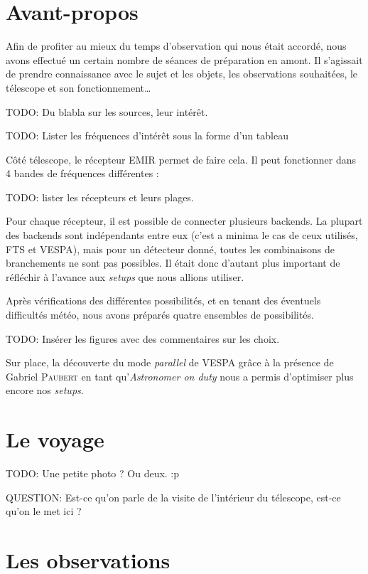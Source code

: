 \documentclass[a4paper,10pt,french]{article}
\begin{document}
\newpage


\setlength{\parindent}{16pt}
\setlength{\parskip}{1ex}


\section{Avant-propos}

Afin de profiter au mieux du temps d’observation qui nous était accordé, nous
avons effectué un certain nombre de séances de préparation en amont. Il
s’agissait de prendre connaissance avec le sujet et les objets, les
observations souhaitées, le télescope et son fonctionnement…

TODO: Du blabla sur les sources, leur intérêt.

TODO: Lister les fréquences d’intérêt sous la forme d’un tableau

Côté télescope, le récepteur EMIR permet de faire cela. Il peut fonctionner
dans 4 bandes de fréquences différentes :

TODO: lister les récepteurs et leurs plages.

Pour chaque récepteur, il est possible de connecter plusieurs backends. La
plupart des backends sont indépendants entre eux (c’est a minima le cas de ceux
utilisés, FTS et VESPA), mais pour un détecteur donné, toutes les combinaisons
de branchements ne sont pas possibles. Il était donc d’autant plus important de
réfléchir à l’avance aux \textit{setups} que nous allions utiliser.

Après vérifications des différentes possibilités, et en tenant des éventuels
difficultés météo, nous avons préparés quatre ensembles de possibilités.

TODO: Insérer les figures avec des commentaires sur les choix.

Sur place, la découverte du mode \textit{parallel} de VESPA grâce à la présence
de Gabriel \textsc{Paubert} en tant qu’\textit{Astronomer on duty} nous a
permis d’optimiser plus encore nos \textit{setups}.

\section{Le voyage}

TODO: Une petite photo ? Ou deux. :p

QUESTION: Est-ce qu’on parle de la visite de l’intérieur du télescope, est-ce
qu’on le met ici ?

\section{Les observations}
\end{document}
